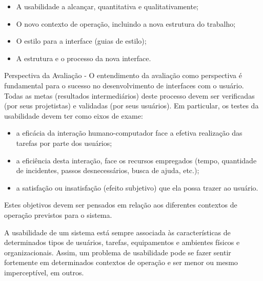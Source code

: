 		\begin{itemize}
			\item{A usabilidade a alcançar, quantitativa e qualitativamente;}
			\item{O novo contexto de operação, incluindo a nova estrutura do trabalho;}
			\item{O estilo para a interface (guias de estilo);}
			\item{A estrutura e o processo da nova interface.}
		\end{itemize}

		Perspectiva da Avaliação - O entendimento da avaliação como perspectiva é fundamental para o sucesso no desenvolvimento de interfaces com o usuário. Todas as metas (resultados intermediários) deste processo devem ser verificadas (por seus projetistas) e validadas (por seus usuários). Em particular, os testes da usabilidade devem ter como eixos de exame:

		\begin{itemize}
			\item{a eficácia da interação humano-computador face a efetiva realização das tarefas por parte dos usuários;}
			\item{a eficiência desta interação, face os recursos empregados (tempo, quantidade de incidentes, passos desnecessários, busca de ajuda, etc.);}
			\item{a satisfação ou insatisfação (efeito subjetivo) que ela possa trazer ao usuário.}
		\end{itemize}

		Estes objetivos devem ser pensados em relação aos diferentes contextos de operação previstos para o sistema.
		
		A usabilidade de um sistema está sempre associada às características de determinados tipos de usuários, tarefas, equipamentos e ambientes físicos e organizacionais. Assim, um problema de usabilidade pode se fazer sentir fortemente em determinados contextos de operação e ser menor ou mesmo imperceptível, em outros.
